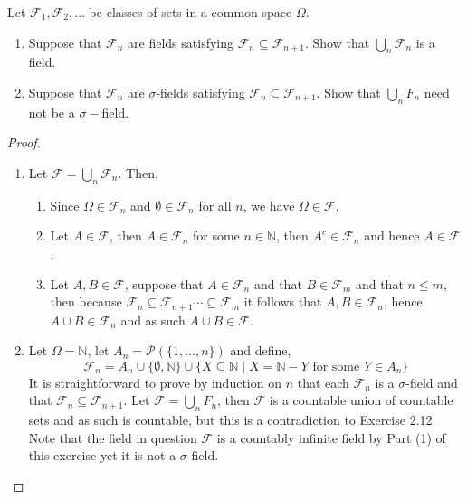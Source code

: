 \documentclass[12pt]{article}
\newcommand{\N}{\mathbb{N}}
\newcommand{\F}{\mathcal{F}}
\newcommand{\seq}{\subseteq}
\newcommand{\Om}{\Omega}
\newcommand{\es}{\emptyset}
\newcommand{\mc}{\mathcal}
\newcommand{\un}{\cup}
\newenvironment{exercise}[2][Exercise]{\begin{trivlist}
\item[\hskip \labelsep {\bfseries #1}\hskip \labelsep {\bfseries #2.}]}{\end{trivlist}}
\begin{document}
\begin{exercise}{2.4}
    Let $\F_1, \F_2, \ldots$ be classes of sets in a common space $\Om$.
    \begin{enumerate}
        \item Suppose that $\F_n$ are fields satisfying $\F_n \seq \F_{n+1}$. Show that $\bigcup_{n} \F_n$ is a field.
        \item Suppose that $\F_n$ are $\sigma$-fields satisfying $\F_n \seq \F_{n+1}$. Show that $\bigcup_{n} F_n$ need not be a $\sigma-$field.
    \end{enumerate}
\end{exercise}
\begin{proof}
    \begin{enumerate}
        \item Let $\F = \bigcup_{n} \F_n$. Then,
        \begin{enumerate}
            \item Since $\Om \in \F_n$ and $\es \in \F_n$ for all $n$, we have $\Om \in \F$.
            \item Let $A \in \F$, then $A \in \F_n$ for some $n \in \N$, then $A^{c} \in \F_n$ and hence $A \in \F$.
            \item Let $A, B \in \F$, suppose that $A \in \F_n$ and that $B \in \F_m$ and that $n \leq m$, then because $\F_n \seq \F_{n+1} \cdots \seq\F_m $ it follows that $A, B \in \F_n$, hence $A \un B \in \F_n$ and as such $A \un B \in \F$.
        \end{enumerate}
        \item Let $\Om = \N$, let $A_n = \mc P (\{ 1, \ldots, n \})$ and define,
        \[ \F_n = A_n \un \{ \es, \N \} \un \{ X \seq \N \mid X = \N - Y \text { for some } Y \in A_n\}  \]
        It is straightforward to prove by induction on $n$ that each $\F_n$ is a $\sigma$-field and that $\F_n \seq \F_{n+1}$. Let $\F = \bigcup_{n} F_n$, then $\F$ is a countable union of countable sets and as such is countable, but this is a contradiction to Exercise 2.12. Note that the field in question $\F$ is a countably infinite field by Part (1) of this exercise yet it is not a $\sigma$-field.
    \end{enumerate}
\end{proof}
\end{document}

